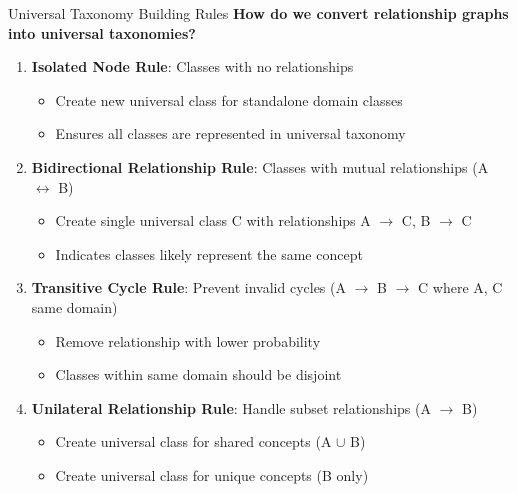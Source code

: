 \documentclass[aspectratio=169]{beamer}
\begin{document}
\begin{frame}{Universal Taxonomy Building Rules}
    \textbf{How do we convert relationship graphs into universal taxonomies?}

    \vspace{0.5em}

    \begin{enumerate}
        \item \textbf{Isolated Node Rule}: Classes with no relationships
              \begin{itemize}
                  \item Create new universal class for standalone domain classes
                  \item Ensures all classes are represented in universal taxonomy
              \end{itemize}

        \item \textbf{Bidirectional Relationship Rule}: Classes with mutual relationships (A $\leftrightarrow$ B)
              \begin{itemize}
                  \item Create single universal class C with relationships A $\rightarrow$ C, B $\rightarrow$ C
                  \item Indicates classes likely represent the same concept
              \end{itemize}

        \item \textbf{Transitive Cycle Rule}: Prevent invalid cycles (A $\rightarrow$ B $\rightarrow$ C where A, C same domain)
              \begin{itemize}
                  \item Remove relationship with lower probability
                  \item Classes within same domain should be disjoint
              \end{itemize}

        \item \textbf{Unilateral Relationship Rule}: Handle subset relationships (A $\rightarrow$ B)
              \begin{itemize}
                  \item Create universal class for shared concepts (A $\cup$ B)
                  \item Create universal class for unique concepts (B only)
              \end{itemize}
    \end{enumerate}
\end{frame}
\end{document}
